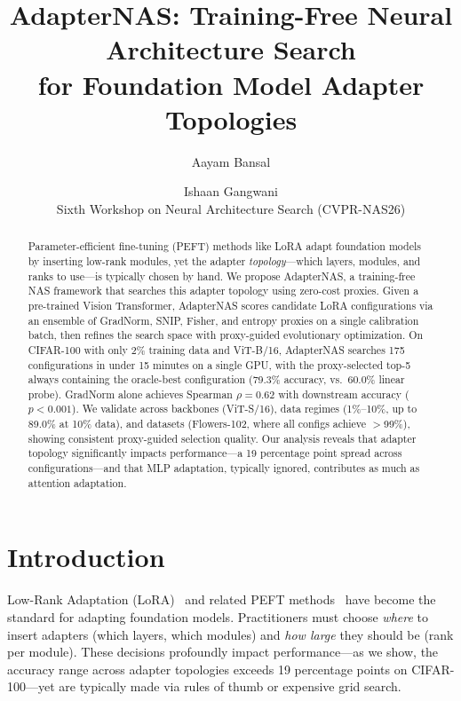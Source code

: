 \documentclass[10pt,twocolumn,letterpaper]{article}
\newcommand{\method}{AdapterNAS\xspace}
\begin{document}
\title{AdapterNAS: Training-Free Neural Architecture Search\\for Foundation Model Adapter Topologies}

\author{Aayam Bansal \and Ishaan Gangwani\\
Sixth Workshop on Neural Architecture Search (CVPR-NAS26)
}

\maketitle

\begin{abstract}
Parameter-efficient fine-tuning (PEFT) methods like LoRA adapt foundation models by inserting low-rank modules, yet the adapter \emph{topology}---which layers, modules, and ranks to use---is typically chosen by hand. We propose \method, a training-free NAS framework that searches this adapter topology using zero-cost proxies. Given a pre-trained Vision Transformer, \method scores candidate LoRA configurations via an ensemble of GradNorm, SNIP, Fisher, and entropy proxies on a single calibration batch, then refines the search space with proxy-guided evolutionary optimization. On CIFAR-100 with only 2\% training data and ViT-B/16, \method searches 175 configurations in under 15 minutes on a single GPU, with the proxy-selected top-5 always containing the oracle-best configuration (79.3\% accuracy, vs.\ 60.0\% linear probe). GradNorm alone achieves Spearman $\rho = 0.62$ with downstream accuracy ($p < 0.001$). We validate across backbones (ViT-S/16), data regimes (1\%--10\%, up to 89.0\% at 10\% data), and datasets (Flowers-102, where all configs achieve $>$99\%), showing consistent proxy-guided selection quality. Our analysis reveals that adapter topology significantly impacts performance---a 19 percentage point spread across configurations---and that MLP adaptation, typically ignored, contributes as much as attention adaptation.
\end{abstract}

\section{Introduction}
\label{sec:intro}

Low-Rank Adaptation (LoRA)~\cite{hu2022lora} and related PEFT methods~\cite{houlsby2019adapters, jia2022vpt} have become the standard for adapting foundation models. Practitioners must choose \emph{where} to insert adapters (which layers, which modules) and \emph{how large} they should be (rank per module). These decisions profoundly impact performance---as we show, the accuracy range across adapter topologies exceeds 19 percentage points on CIFAR-100---yet are typically made via rules of thumb or expensive grid search.
\end{document}
